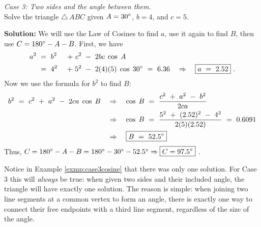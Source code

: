 \begin{exmp}\label{exmp:case3cosine}
\noindent \emph{Case 3: Two sides and the angle between them.}\\Solve the triangle $\triangle\,ABC$ given
 $A = 30^\circ$, $b = 4$, and $c = 5$.\vspace{1mm}
 \par\noindent\textbf{Solution:} We will use the Law of Cosines to find $a$, use it again to find
 $B$, then use $C = 180^\circ - A - B$. First, we have
 \begin{alignat*}{4}
  a^2 ~ &= ~ b^2 ~ &+ ~ c^2 ~ &- ~ 2bc\;\cos\;A\\
   &= ~ 4^2 ~ &+ ~ 5^2 ~ &- ~ 2(4)(5)\;\cos\;30^\circ ~=~ 6.36 \quad\Rightarrow\quad
   \boxed{a ~=~ 2.52} ~.
 \end{alignat*}
 Now we use the formula for $b^2$ to find $B$:
 \begin{align*}
  b^2 ~ = ~ c^2 ~ + ~ a^2 ~ - ~ 2ca\;\cos\;B \quad&\Rightarrow\quad
  \cos\;B ~=~ \frac{c^2 ~ + ~ a^2 ~-~ b^2}{2ca}\\
  &\Rightarrow\quad \cos\;B ~=~ \frac{5^2 ~ + ~ (2.52)^2 ~-~ 4^2}{2(5)(2.52)} ~=~ 0.6091\\
  &\Rightarrow\quad \boxed{B ~=~ 52.5^\circ}
 \end{align*}
 Thus, $C = 180^\circ - A - B = 180^\circ - 30^\circ - 52.5^\circ \Rightarrow
 \boxed{C = 97.5^\circ}\;$.
\end{exmp}\vspace{-2mm}
\divider
\vspace{2mm}

Notice in Example \ref{exmp:case3cosine} that there was only one solution. For Case 3 this will
\emph{always} be true: when given two sides and their included angle, the triangle will have
exactly one solution. The reason is simple: when joining two line segments at a common vertex to
form an angle, there is exactly one way to connect their free endpoints with a third line segment,
regardless of the size of the angle.

